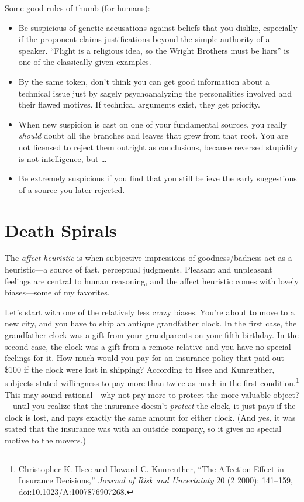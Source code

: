 {
 Some good rules of thumb (for humans):}

\begin{itemize}
\item {
 Be suspicious of genetic accusations against beliefs that you
dislike, especially if the proponent claims justifications beyond the
simple authority of a speaker. ``Flight is a religious
idea, so the Wright Brothers must be liars'' is one
of the classically given examples.}

\item {
 By the same token, don't think you can get good
information about a technical issue just by sagely psychoanalyzing the
personalities involved and their flawed motives. If technical arguments
exist, they get priority.}

\item {
 When new suspicion is cast on one of your fundamental sources, you
really \textit{should} doubt all the branches and leaves that grew from
that root. You are not licensed to reject them outright as conclusions,
because reversed stupidity is not intelligence, but \ldots}

\item {
 Be extremely suspicious if you find that you still believe the
 early suggestions of a source you later rejected.}
\end{itemize}

\myendsectiontext

\chapter{Death Spirals}


{
 The \textit{affect heuristic} is when subjective impressions of
goodness/badness act as a heuristic---a source of fast, perceptual
judgments. Pleasant and unpleasant feelings are central to human
reasoning, and the affect heuristic comes with lovely biases---some of
my favorites. }

{
 Let's start with one of the relatively less crazy
biases. You're about to move to a new city, and you
have to ship an antique grandfather clock. In the first case, the
grandfather clock was a gift from your grandparents on your fifth
birthday. In the second case, the clock was a gift from a remote
relative and you have no special feelings for it. How much would you
pay for an insurance policy that paid out \$100 if the clock were lost
in shipping? According to Hsee and Kunreuther, subjects stated
willingness to pay more than twice as much in the first
condition.\footnote{Christopher K. Hsee and Howard C. Kunreuther,
``The Affection Effect in Insurance
Decisions,'' \textit{Journal of Risk and Uncertainty}
20 (2 2000): 141--159, doi:10.1023/A:1007876907268.} This may sound rational---why not pay
more to protect the more valuable object?---until you realize that the
insurance doesn't \textit{protect} the clock, it just
pays if the clock is lost, and pays exactly the same amount for either
clock. (And yes, it was stated that the insurance was with an outside
company, so it gives no special motive to the movers.)}

